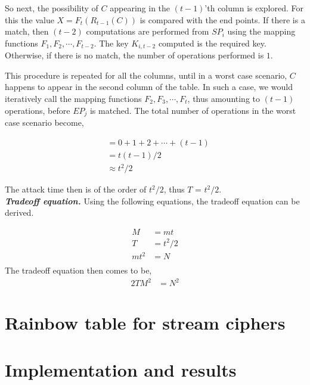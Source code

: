 So next, the possibility of $C$ appearing in the $(t-1)$'th column is explored. For this the value $X = F_{t}(R_{t-1}(C))$ is compared with the end points. If there is a match, then $(t-2)$ computations are performed from $SP_{i}$ using the mapping functions $F_1, F_2, \cdots, F_{t-2}$. The key $K_{i,t-2}$ computed is the required key. Otherwise, if there is no match, the number of operations performed is $1$.

This procedure is repeated for all the columns, until in a worst case scenario, $C$ happens to appear in the second column of the table. In such a case, we would iteratively call the mapping functions $F_2, F_3, \cdots, F_t$, thus amounting to $(t-1)$ operations, before $EP_j$ is matched. The total number of operations in the worst case scenario become, 

\begin{align*}
&= 0 + 1 + 2 + \cdots + (t-1)\\
&= t(t-1)/2\\
&\approx t^2/2
\end{align*}

The attack time then is of the order of $t^2/2$, thus $T$ = $t^2/2$.\\


\noindent \textit{\textbf{Tradeoff equation.}} Using the following equations, the tradeoff equation can be derived. 

\begin{align*}
M &= mt\\
T &= t^2/2\\
mt^2 &= N\\
\end{align*}
The tradeoff equation then comes to be,
\begin{align}
\label{eq:tmdto-rainbow-block} 2TM^2 &= N^2
\end{align}


\section{Rainbow table for stream ciphers}
\label{sec:rainbow-stream}


\section{Implementation and results}
\label{sec:rainbow-impl}